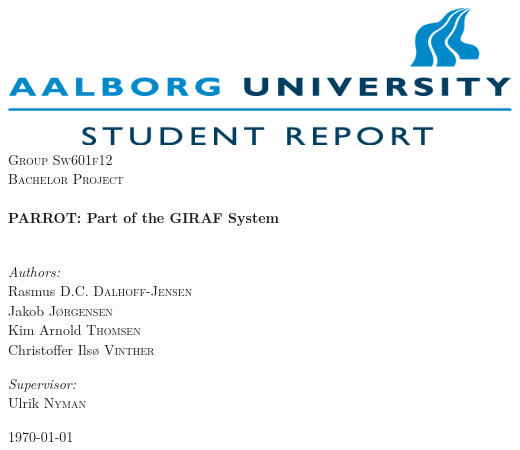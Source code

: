 \begin{nopagebreak}

\begin{center}

\includegraphics[width=\textwidth]{input/Images/aaulogo_study2}\\[1cm]    

\textsc{\LARGE Group Sw601f12}\\[1.5cm]

\textsc{\Large Bachelor Project}\\[0.5cm]


\HRule \\[0.4cm]
{ \huge \bfseries PARROT: Part of the GIRAF System}\\[0.4cm]

\HRule \\[1.5cm]

\begin{minipage}{0.4\textwidth}
\begin{flushleft} \large
\vspace{1.25cm}
\emph{Authors:}\\
Rasmus D.C. \textsc{Dalhoff-Jensen} \\
Jakob \textsc{J\o{}rgensen} \\
Kim Arnold \textsc{Thomsen}\\
Christoffer Ils\o{} \textsc{Vinther}

\end{flushleft}
\end{minipage}
\begin{minipage}{0.4\textwidth}
\begin{flushright} \large
\emph{Supervisor:} \\
Ulrik \textsc{Nyman}
\end{flushright}
\end{minipage}

\vfill

{\large \today}

\end{center}

\end{nopagebreak}
